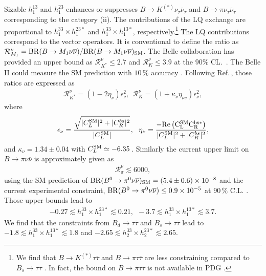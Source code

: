 \documentclass[12pt, a4paper]{article}
\numberwithin{equation}{section} %
\newcommand{\ov}{\overline}
\newcommand{\1}{\mbox{1}\hspace{-0.25em}\mbox{l}}
\begin{document}
Sizable $h_1^{13}$ and $h_1^{23}$ enhances or suppresses $B\to K^{(*)} \nu_\tau\ov\nu_\tau$ and $B\to \pi \nu_\tau\ov\nu_\tau$ corresponding to the category 
(ii).
The contributions of the LQ exchange are proportional to $h_1^{33}\times h_1^{23*}$ and $h_1^{33}\times h_1^{13*}$, respectively.\footnote{We find that $B\to K^{(*)} \tau\ov\tau$ and $B\to \pi \tau\ov\tau$ are less constraining compared to $B_s\to\tau\tau$ \cite{Capdevila:2017iqn}. In fact, the bound on $B\to \pi \tau\ov\tau$ is not available in PDG \cite{PDG2022}.
}
The LQ contributions correspond to the vector operators.
It is conventional to define the ratio as $\mathcal{R}_{M_1}^{\nu} = {\rm{BR}}(B\to M_1\nu\ov\nu )/{\rm{BR}}(B\to M_1 \nu\ov\nu )_{\rm{SM}}$.
The Belle collaboration has provided an upper bound as 
 $\mathcal{R}_{K^*}^{\nu} \le 2.7$ and $\mathcal{R}_{K}^{\nu } \le 3.9$ at the $90\%$ CL.~\cite{Belle:2017oht}.
The Belle II could measure the SM prediction with $10\,\%$ accuracy \cite{Kou:2018nap}.
Following Ref.\,\cite{Buras:2014fpa}, those ratios are expressed as 
\begin{align}
\mathcal{R}_{K^*}^{\nu} =(1-2\eta_{\nu})\epsilon_{\nu}^2,~~
\mathcal{R}_{K}^{\nu} =(1+\kappa_{\nu}\eta_{\nu\nu})\epsilon_{\nu}^2,
\end{align}
where
\begin{align}
\epsilon_{\nu}=\frac{\sqrt{|C_L^{\rm SM}|^2+|C_{R}^{bs}|^2}}{|C_L^{\rm SM}|},~~
\eta_{\nu}=\frac{-\rm{Re}\left( C_L^{\rm SM}C_{R}^{bs*} \right)}{|C_L^{\rm SM}|^2+|C_{R}^{bs}|^2},
\end{align}
and $\kappa_{\nu}= 1.34 \pm 0.04$ with $C_L^{\rm SM}\simeq-6.35\,$.
Similarly the current upper limit on $B\to \pi\nu\ov \nu$ is approximately given as 
\begin{align}
\mathcal{R}_{\pi}^{\nu}\lesssim 6000,
\end{align}
using the SM prediction of ${\rm{BR}}(B^0\to\pi^0 \nu\ov \nu)_{{\rm{SM}}}=(5.4\pm0.6)\times 10^{-8}$ \cite{Bause:2022rrs} and the current experimental constraint, ${\rm{BR}}(B^0\to\pi^0 \nu\ov \nu)\le0.9\times 10^{-5}$ at $90\,\%$ C.L. \cite{PDG2022}.
Those upper bounds lead to 
\begin{align}
   -0.27 \lesssim h_1^{33}\times h_1^{23*}\lesssim 0.21,~~
   -3.7 \lesssim h_1^{33}\times h_1^{13*}\lesssim 3.7.
\end{align}
We find that the constraints from $B_d\to\tau\ov\tau$ and $B_s\to\tau\ov\tau$ lead to $-1.8 \lesssim h_1^{33}\times h_1^{13*} \lesssim 1.8$ and $-2.65 \lesssim h_2^{33}\times h_2^{23*} \lesssim 2.65$.
\end{document}
